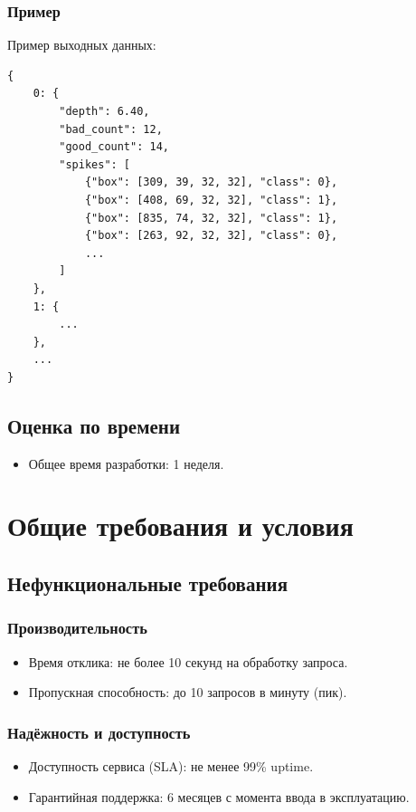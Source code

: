 \documentclass[12pt]{article}
\begin{document}
\subsubsection{Пример}
Пример выходных данных:
\begin{verbatim}
{
	0: {
		"depth": 6.40,
		"bad_count": 12,
		"good_count": 14,
		"spikes": [
			{"box": [309, 39, 32, 32], "class": 0},
			{"box": [408, 69, 32, 32], "class": 1},
			{"box": [835, 74, 32, 32], "class": 1},
			{"box": [263, 92, 32, 32], "class": 0},
			...
		]
	},
	1: {
		...
	},
	...
}
\end{verbatim}


\subsection{Оценка по времени}
\begin{itemize}
	\item Общее время разработки: 1 неделя.
\end{itemize}


\section{Общие требования и условия}

\subsection{Нефункциональные требования}

\subsubsection{Производительность}
\begin{itemize}
	\item Время отклика: не более 10 секунд на обработку запроса.
	\item Пропускная способность: до 10 запросов в минуту (пик).
\end{itemize}

\subsubsection{Надёжность и доступность}
\begin{itemize}
	\item Доступность сервиса (SLA): не менее 99\% uptime.
	\item Гарантийная поддержка: 6 месяцев с момента ввода в эксплуатацию.
\end{itemize}
\end{document}
